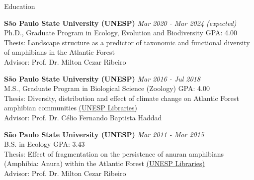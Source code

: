 \documentclass{resume}
\begin{document}
\begin{rSection}{Education}

{\bf São Paulo State University (UNESP)} \hfill {\em Mar 2020 - Mar 2024 (expected)} 
\\ Ph.D., Graduate Program in Ecology, Evolution and Biodiversity \hfill { GPA: 4.00 } 
\\ Thesis: Landscape structure as a predictor of taxonomic and functional diversity of amphibians in the Atlantic Forest \\ Advisor: Prof. Dr. Milton Cezar Ribeiro

{\bf São Paulo State University (UNESP)} \hfill {\em Mar 2016 - Jul 2018} 
\\ M.S., Graduate Program in Biological Science (Zoology)\hfill { GPA: 4.00 } 
\\ Thesis: Diversity, distribution and effect of climate change on Atlantic Forest amphibian communities \href{https://repositorio.unesp.br/handle/11449/154993}{\underline{(UNESP Libraries)}} 
\\ Advisor: Prof. Dr. Célio Fernando Baptista Haddad

{\bf São Paulo State University (UNESP)} \hfill {\em Mar 2011 - Mar 2015} 
\\ B.S. in Ecology\hfill { GPA: 3.43 } 
\\ Thesis: Effect of fragmentation on the persistence of anuran amphibians (Amphibia: Anura) within the Atlantic Forest \href{https://repositorio.unesp.br/handle/11449/138991}{\underline{(UNESP Libraries)}} 
\\ Advisor: Prof. Dr. Milton Cezar Ribeiro

\end{rSection}

\end{document}
